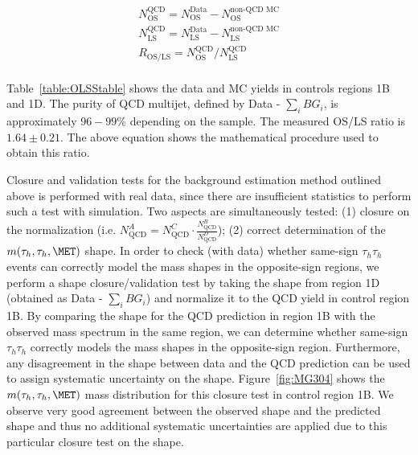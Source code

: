 \begin{center}
\begin{eqnarray}
 N^{\textrm{QCD}}_{\textrm{OS}} = N^{\textrm{Data}}_{\textrm{OS}} - N^{\textrm{non-QCD MC}}_{\textrm{OS}} \nonumber\\
 N^{\textrm{QCD}}_{\textrm{LS}} = N^{\textrm{Data}}_{\textrm{LS}} - N^{\textrm{non-QCD MC}}_{\textrm{LS}} \\  
R_{\textrm{OS/LS}} = N^{\textrm{QCD}}_{\textrm{OS}}/N^{\textrm{QCD}}_{\textrm{LS}} \nonumber\\ 
\label{eqn:OSLSratio}
\end{eqnarray}
\end{center}

Table~\ref{table:OLSStable} shows the data and MC yields in controls regions 1B and 1D. The purity of QCD multijet, defined by Data - $\sum\limits_{i} BG_{i}$, is 
approximately $96-99$\% depending on the sample. The measured OS/LS ratio is $1.64\pm0.21$. The above equation shows the mathematical procedure used to obtain 
this ratio. 

Closure and validation tests for the background estimation method outlined above is performed with real data, since there are insufficient statistics to perform 
such a test with simulation. Two aspects are simultaneously tested: (1) closure on the normalization (i.e. $N_{\textrm{QCD}}^{A} = N_{\textrm{QCD}}^{C} \cdot 
\frac{N_{\textrm{QCD}}^{B}}{N_{\textrm{QCD}}^{D}}$); (2) correct determination of the $m(\tau_{h},\tau_{h},\MET)$ shape. In order to check (with data) whether same-sign $\tau_{h}\tau_{h}$ events can correctly model the mass shapes in the opposite-sign regions, we perform a shape closure/validation test by taking the shape from region 1D (obtained as Data - $\sum\limits_{i} BG_{i}$) and normalize it to the QCD yield in control region 1B. By comparing the
shape for the QCD prediction in region 1B with the observed mass spectrum in the same region, we can determine whether same-sign $\tau_{h}\tau_{h}$ correctly models the mass shapes in the opposite-sign region. Furthermore, any disagreement in the shape between data and the QCD prediction can be used to assign systematic uncertainty on the shape. Figure~\ref{fig:MG304} shows the $m(\tau_{h},\tau_{h},\MET)$ mass distribution for this closure test in control region 1B. We observe very good agreement between the observed shape and the predicted shape and thus no additional
systematic uncertainties are applied due to this particular closure test on the shape. 



